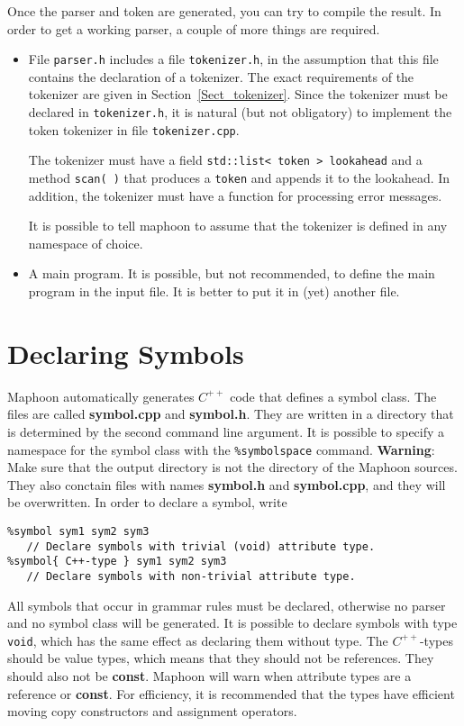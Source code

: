 \documentclass{article}
\begin{document}
\noindent
Once the parser and token are generated, you can try to 
compile the result.
In order to get a working parser, a couple of more things
are required.

\begin{itemize}
\item
   File \verb+parser.h+ includes a file
   \verb+tokenizer.h+, in the assumption that this file contains the 
   declaration of a tokenizer.  
   The exact requirements of the tokenizer are given in 
   Section~\ref{Sect_tokenizer}.
   Since the tokenizer must be declared in \verb+tokenizer.h+,
   it is natural (but not obligatory) to implement the
   token tokenizer in file \verb+tokenizer.cpp+.
   
   The tokenizer must have a field 
   \verb+std::list< token > lookahead+ and a method
   \verb+scan( )+ that produces a \verb+token+ and appends
   it to the lookahead. 
   In addition, the tokenizer must have a function for processing error 
   messages.
  
   It is possible to tell maphoon to assume that the 
   tokenizer is defined in any namespace of choice.
 
\item 
   A main program. It is possible, but not recommended, to define the main
   program in the input file. It is better to put it in (yet) another file.

\end{itemize}


\section{Declaring Symbols}

Maphoon automatically generates $ C^{++} $ code that defines
a symbol class.
The files are called {\bf symbol.cpp} and {\bf symbol.h}.
They are written in a directory that is determined by the second command
line argument. It is possible to specify a namespace for the
symbol class with the \verb+%symbolspace+ command. 
{\bf Warning}: Make sure that the output directory is not the
directory of the Maphoon sources. 
They also conctain files with names
{\bf symbol.h} and {\bf symbol.cpp},
and they will be overwritten.
In order to declare a symbol, write
\begin{verbatim}
%symbol sym1 sym2 sym3  
   // Declare symbols with trivial (void) attribute type.
%symbol{ C++-type } sym1 sym2 sym3 
   // Declare symbols with non-trivial attribute type. 
\end{verbatim} 
All symbols that occur in grammar rules must be
declared, otherwise no parser and no symbol class will be generated.
It is possible to declare symbols with type \verb+void+,
which has the same effect as declaring them without type.
The $C^{++} $-types should be value types, which means that they should
not be references. They should also not be
{\bf const}. Maphoon will warn when attribute types 
are a reference or {\bf const}.
For efficiency, it is recommended that the
types have efficient moving copy constructors and assignment
operators. 
\end{document}
